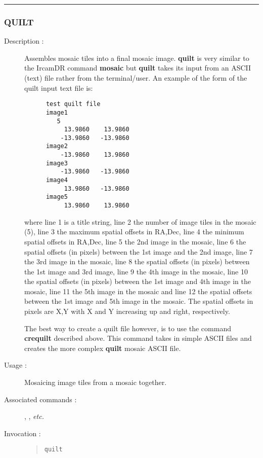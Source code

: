 \hrule
\subsubsection*{\label{QUILT}QUILT}

\begin{description}

\item[Description :] Assembles mosaic tiles into a final mosaic image.
{\bf quilt} is very similar to the {\sc IrcamDR} command {\bf mosaic}
but {\bf quilt} takes its input from an ASCII (text) file rather from
the terminal/user.  An example of the form of the quilt input text file
is:

\begin{small}
\begin{verbatim}
      test quilt file
      image1
         5
           13.9860    13.9860
          -13.9860   -13.9860
      image2
          -13.9860    13.9860
      image3
          -13.9860   -13.9860
      image4
           13.9860   -13.9860
      image5
           13.9860    13.9860
\end{verbatim}
\end{small}

where line 1 is a title string, line 2 the number of image tiles in the
mosaic (5), line 3 the maximum spatial offsets in RA,Dec, line 4 the
minimum spatial offsets in RA,Dec, line 5 the 2nd image in the mosaic,
line 6 the spatial offsets (in pixels) between the 1st image and the 2nd
image, line 7 the 3rd image in the mosaic, line 8 the spatial offsets (in
pixels) between the 1st image and 3rd image, line 9 the 4th image in the
mosaic, line 10 the spatial offsets (in pixels) between the 1st image and
4th image in the mosaic, line 11 the 5th image in the mosaic and line 12
the spatial offsets between the 1st image and 5th image in the mosaic.
The spatial offsets in pixels are X,Y with X and Y increasing up and
right, respectively.

The best way to create a quilt file however, is to use the command
{\bf crequilt} described above.  This command takes in simple ASCII files and
creates the more complex {\bf quilt} mosaic ASCII file.


\item[Usage :] Mosaicing image tiles from a mosaic together.

\item[Associated commands :] {\tt {}},
{\tt {}}, {\tt {}} \emph{etc.}

\item[Invocation :]

\begin{quote}{\tt  quilt }\end{quote}

\end{description}

